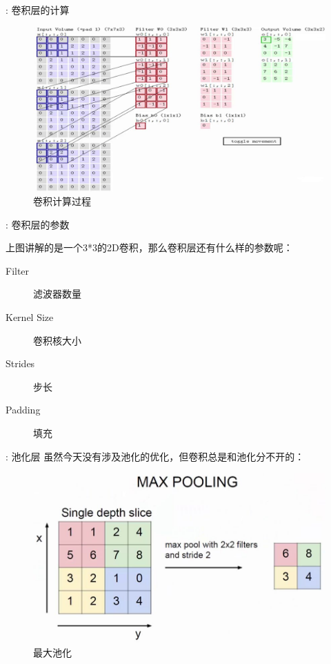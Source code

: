 \begin{frame}{\titleprefix: 卷积层的计算}
	\begin{figure}
		\centering
		\includegraphics[width=\linewidth]{Images/conv_1}
		\caption{卷积计算过程}
		\label{fig:conv1}
	\end{figure}
	
\end{frame}

\begin{frame}{\titleprefix: 卷积层的参数}
	
	上图讲解的是一个3*3的2D卷积，那么卷积层还有什么样的参数呢：
	\begin{description}
		\item[Filter] 滤波器数量
		\item[Kernel Size] 卷积核大小
		\item[Strides] 步长
		\item[Padding] 填充
	\end{description}
	
\end{frame}

\begin{frame}{\titleprefix: 池化层}
	虽然今天没有涉及池化的优化，但卷积总是和池化分不开的：
	\begin{figure}
		\centering
		\includegraphics[width=0.7\linewidth]{Images/pool_1}
		\caption{最大池化}
		\label{fig:pool1}
	\end{figure}
\end{frame}

